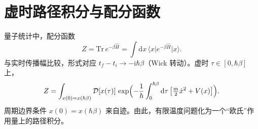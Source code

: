 \section{虚时路径积分与配分函数}

量子统计中，配分函数
\begin{equation}
  Z=\mathrm{Tr}\,e^{-\beta\hat H}
  =\int\mathrm{d}x\,
  \bigl\langle x\big|e^{-\beta\hat H}\big|x\bigr\rangle.
\end{equation}
与实时传播幅比较，形式对应 $t_f-t_i\to-\mathrm{i}\hbar\beta$（Wick 转动）。虚时 $\tau\in[0,\hbar\beta]$ 上，
\begin{equation}
  Z
  =\int_{x(0)=x(\hbar\beta)}
  \mathcal{D}[x(\tau)]\,
  \exp\Bigl(
  -\frac{1}{\hbar}
  \int_0^{\hbar\beta}\mathrm{d}\tau\,
  \bigl[\tfrac{m}{2}\dot x^2+V(x)\bigr]
  \Bigr).
\end{equation}
周期边界条件 $x(0)=x(\hbar\beta)$ 来自迹。由此，有限温度问题化为一个“欧氏”作用量上的路径积分。

